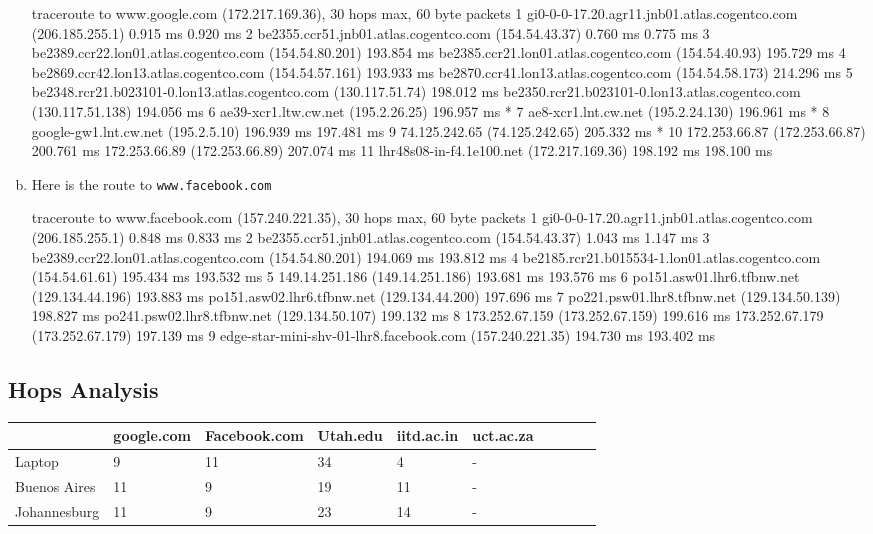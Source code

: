 \documentclass{article}
\begin{document}
\begin{enumerate}[a.]
\begin{code}
traceroute to www.google.com (172.217.169.36), 30 hops max, 60 byte packets
 1  gi0-0-0-17.20.agr11.jnb01.atlas.cogentco.com (206.185.255.1)  0.915 ms  0.920 ms
 2  be2355.ccr51.jnb01.atlas.cogentco.com (154.54.43.37)  0.760 ms  0.775 ms
 3  be2389.ccr22.lon01.atlas.cogentco.com (154.54.80.201)  193.854 ms be2385.ccr21.lon01.atlas.cogentco.com (154.54.40.93)  195.729 ms
 4  be2869.ccr42.lon13.atlas.cogentco.com (154.54.57.161)  193.933 ms be2870.ccr41.lon13.atlas.cogentco.com (154.54.58.173)  214.296 ms
 5  be2348.rcr21.b023101-0.lon13.atlas.cogentco.com (130.117.51.74)  198.012 ms be2350.rcr21.b023101-0.lon13.atlas.cogentco.com (130.117.51.138)  194.056 ms
 6  ae39-xcr1.ltw.cw.net (195.2.26.25)  196.957 ms *
 7  ae8-xcr1.lnt.cw.net (195.2.24.130)  196.961 ms *
 8  google-gw1.lnt.cw.net (195.2.5.10)  196.939 ms  197.481 ms
 9  74.125.242.65 (74.125.242.65)  205.332 ms *
10  172.253.66.87 (172.253.66.87)  200.761 ms 172.253.66.89 (172.253.66.89)  207.074 ms
11  lhr48s08-in-f4.1e100.net (172.217.169.36)  198.192 ms  198.100 ms
\end{code}
\item Here is the route to {\tt www.facebook.com}
\begin{code}
traceroute to www.facebook.com (157.240.221.35), 30 hops max, 60 byte packets
 1  gi0-0-0-17.20.agr11.jnb01.atlas.cogentco.com (206.185.255.1)  0.848 ms  0.833 ms
 2  be2355.ccr51.jnb01.atlas.cogentco.com (154.54.43.37)  1.043 ms  1.147 ms
 3  be2389.ccr22.lon01.atlas.cogentco.com (154.54.80.201)  194.069 ms  193.812 ms
 4  be2185.rcr21.b015534-1.lon01.atlas.cogentco.com (154.54.61.61)  195.434 ms  193.532 ms
 5  149.14.251.186 (149.14.251.186)  193.681 ms  193.576 ms
 6  po151.asw01.lhr6.tfbnw.net (129.134.44.196)  193.883 ms po151.asw02.lhr6.tfbnw.net (129.134.44.200)  197.696 ms
 7  po221.psw01.lhr8.tfbnw.net (129.134.50.139)  198.827 ms po241.psw02.lhr8.tfbnw.net (129.134.50.107)  199.132 ms
 8  173.252.67.159 (173.252.67.159)  199.616 ms 173.252.67.179 (173.252.67.179)  197.139 ms
 9  edge-star-mini-shv-01-lhr8.facebook.com (157.240.221.35)  194.730 ms  193.402 ms
\end{code}
\end{enumerate}

\subsection*{Hops Analysis}

\begin{table}[!ht]
    \centering
    \begin{tabular}{|l|l|l|l|l|l|l|l|l|l|}
    \hline
        ~ & google.com & Facebook.com & Utah.edu & iitd.ac.in & uct.ac.za  \\ \hline
        Laptop & 9 & 11 & 34 & 4 & - \\ \hline
        Buenos Aires & 11 & 9 & 19 & 11 & - \\ \hline
        Johannesburg & 11 & 9 & 23 & 14 & -  \\ \hline
    \end{tabular}
\end{table}
\end{document}

